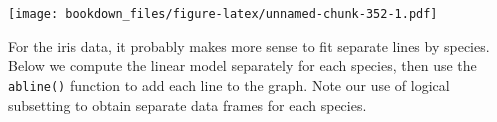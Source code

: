 \documentclass[
]{krantz}
\makeatletter
\newenvironment{Shaded}{\begin{snugshade}}{\end{snugshade}}
\newcommand{\DataTypeTok}[1]{\textcolor[rgb]{0.27,0.27,0.27}{#1}}
\newcommand{\DecValTok}[1]{\textcolor[rgb]{0.06,0.06,0.06}{#1}}
\newcommand{\FloatTok}[1]{\textcolor[rgb]{0.06,0.06,0.06}{#1}}
\newcommand{\KeywordTok}[1]{\textcolor[rgb]{0.27,0.27,0.27}{\textbf{#1}}}
\newcommand{\NormalTok}[1]{#1}
\newcommand{\OperatorTok}[1]{\textcolor[rgb]{0.43,0.43,0.43}{\textbf{#1}}}
\newcommand{\StringTok}[1]{\textcolor[rgb]{0.5,0.5,0.5}{#1}}
\newenvironment{kframe}{%
\medskip{}
\setlength{\fboxsep}{.8em}
 \def\at@end@of@kframe{}%
 \ifinner\ifhmode%
  \def\at@end@of@kframe{\end{minipage}}%
  \begin{minipage}{\columnwidth}%
 \fi\fi%
 \def\FrameCommand##1{\hskip\@totalleftmargin \hskip-\fboxsep
 \colorbox{shadecolor}{##1}\hskip-\fboxsep
     \hskip-\linewidth \hskip-\@totalleftmargin \hskip\columnwidth}%
 \MakeFramed {\advance\hsize-\width
   \@totalleftmargin\z@ \linewidth\hsize
   \@setminipage}}%
 {\par\unskip\endMakeFramed%
 \at@end@of@kframe}
\renewenvironment{Shaded}{\begin{kframe}}{\end{kframe}}
\makeatother
\begin{document}
\begin{Shaded}
\end{Shaded}

\texttt{[image: bookdown\_files/figure-latex/unnamed-chunk-352-1.pdf]}

For the iris data, it probably makes more sense to fit separate lines by species. Below we compute the linear model separately for each species, then use the \texttt{abline()} function to add each line to the graph. Note our use of logical subsetting to obtain separate data frames for each species.
\end{document}
